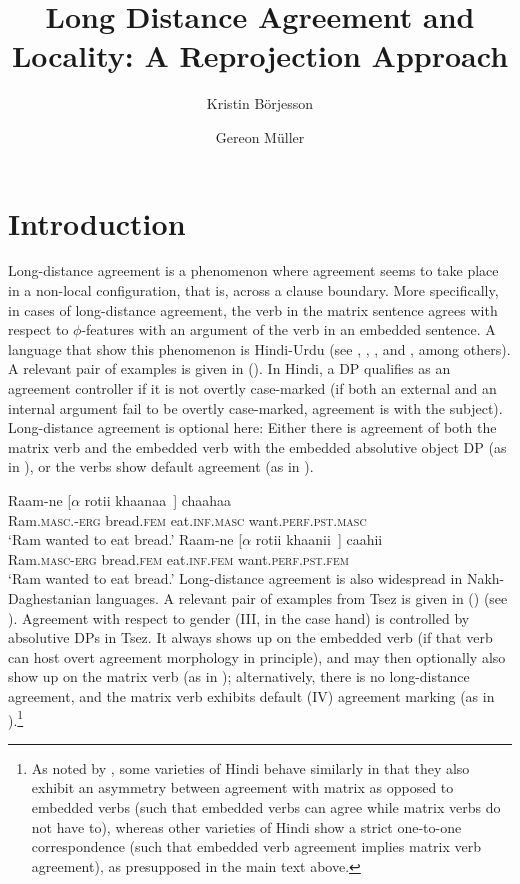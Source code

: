 \documentclass[output=paper
,modfonts
,nonflat]{langsci/langscibook}
\title{Long Distance Agreement and Locality: A Reprojection Approach}
\author{Kristin B\"orjesson\affiliation{Universit{\"a}t Leipzig}\and Gereon M\"uller\affiliation{Universit\"at Leipzig}}
\begin{document}
\maketitle

\newcommand{\refprefix}{ex:mueller:}
\section{Introduction}

Long-distance agreement is a phenomenon where agreement seems to take
place in a non-local configuration, that is, across a clause boundary.
More specifically, in cases of long-distance agreement, the verb in
the matrix sentence agrees with respect to $\phi$-features with an
argument of the verb in an embedded sentence. A language that show
this phenomenon is Hindi-Urdu (see \cite{Mahajan:90},
\cite{Butt:95,Butt:08}, \cite{Bhatt:05}, and \cite{Chandra:05}, among
others). A relevant pair of examples is given in (\Next). In Hindi, a DP
qualifies as an agreement controller if it is not overtly case-marked (if
both an external and an internal argument fail to be overtly
case-marked, agreement is with the subject). Long-distance agreement
is optional here: Either there is agreement of both the matrix verb
and the embedded verb with the embedded absolutive object DP (as in
\Next[b]), or the verbs show default agreement (as in \Next[a]).

\ea\label{ex:mueller:1}
\ea 
\gll  Raam-ne [$\alpha$ rotii khaanaa~] chaahaa \\ 
      Ram.{\scshape masc}.-{\scshape erg} {} bread.{\scshape fem} eat.{\scshape inf}.{\scshape masc} want.{\scshape perf.pst.masc} \\ 
\glt  `Ram wanted to eat bread.'
\ex 
\gll Raam-ne [$\alpha$ rotii khaanii~] caahii \\ 
     Ram.{\scshape masc}-{\scshape erg} {} bread.{\scshape fem} eat.{\scshape inf}.{\scshape fem} want.{\scshape perf.pst.fem} \\ 
\glt `Ram wanted to eat bread.'
\z
\z
Long-distance agreement is also widespread in Nakh-Daghestanian
languages. A relevant pair of examples from Tsez is given in (\Next)
(see \cite{Polinsky&Potsdam:01}). Agreement with respect to gender
(III, in the case hand) is controlled by
absolutive DPs in Tsez. It always shows up on the embedded verb (if
that verb can host overt agreement morphology in principle), and may
then optionally also show up on the matrix verb (as in \Next[b]);
alternatively, there is no long-distance agreement, and the matrix
verb exhibits default (IV) agreement marking (as in \Next[a]).\footnote{As
  noted by \cite{Bhatt:05}, some varieties of Hindi behave similarly
  in that they also exhibit an asymmetry between agreement with matrix
  as opposed to embedded verbs (such that embedded verbs can agree
  while matrix verbs do not have to), whereas other varieties of Hindi show a
  strict one-to-one correspondence (such that embedded verb agreement
  implies matrix verb agreement), as presupposed in the main text above.}
\end{document}
